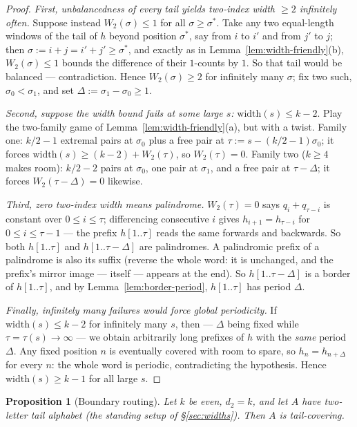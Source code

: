 \documentclass[11pt,reqno]{amsart}
\theoremstyle{plain}
\newtheorem{proposition}[theorem]{Proposition}
\theoremstyle{definition}
\theoremstyle{remark}
\begin{document}
\begin{proof}
\emph{First, unbalancedness of every tail yields two-index width $\ge 2$
infinitely often.} Suppose instead $W_2(\sigma) \le 1$ for all $\sigma \ge
\sigma^*$. Take any two equal-length windows of the tail of $h$ beyond position
$\sigma^*$, say from $i$ to $i'$ and from $j'$ to $j$; then $\sigma := i + j =
i' + j' \ge \sigma^*$, and exactly as in
Lemma~\ref{lem:width-friendly}(b), $W_2(\sigma) \le 1$ bounds the difference of
their $1$-counts by $1$. So that tail would be balanced --- contradiction. Hence
$W_2(\sigma) \ge 2$ for infinitely many $\sigma$; fix two such, $\sigma_0 <
\sigma_1$, and set $\Delta := \sigma_1 - \sigma_0 \ge 1$.

\emph{Second, suppose the width bound fails at some large $s$:} $\mathrm{width}(s)
\le k - 2$. Play the two-family game of Lemma~\ref{lem:width-friendly}(a), but with
a twist. Family one: $k/2 - 1$ extremal pairs at $\sigma_0$ plus a free pair at
$\tau := s - (k/2 - 1)\sigma_0$; it forces $\mathrm{width}(s) \ge (k - 2) +
W_2(\tau)$, so $W_2(\tau) = 0$. Family two ($k \ge 4$ makes room): $k/2 - 2$ pairs
at $\sigma_0$, one pair at $\sigma_1$, and a free pair at $\tau - \Delta$; it
forces $W_2(\tau - \Delta) = 0$ likewise.

\emph{Third, zero two-index width means palindrome.} $W_2(\tau) = 0$ says $q_i +
q_{\tau - i}$ is constant over $0 \le i \le \tau$; differencing consecutive $i$
gives $h_{i+1} = h_{\tau - i}$ for $0 \le i \le \tau - 1$ --- the prefix
$h[1..\tau]$ reads the same forwards and backwards. So both $h[1..\tau]$ and
$h[1..\tau - \Delta]$ are palindromes. A palindromic prefix of a palindrome is also
its suffix (reverse the whole word: it is unchanged, and the prefix's mirror image
--- itself --- appears at the end). So $h[1..\tau - \Delta]$ is a border of
$h[1..\tau]$, and by Lemma~\ref{lem:border-period}, $h[1..\tau]$ has period
$\Delta$.

\emph{Finally, infinitely many failures would force global periodicity.} If
$\mathrm{width}(s) \le k-2$ for infinitely many $s$, then --- $\Delta$ being fixed
while $\tau = \tau(s) \to \infty$ --- we obtain arbitrarily long prefixes of $h$
with the \emph{same} period $\Delta$. Any fixed position $n$ is eventually covered
with room to spare, so $h_n = h_{n + \Delta}$ for every $n$: the whole word is
periodic, contradicting the hypothesis. Hence $\mathrm{width}(s) \ge k - 1$ for all
large $s$.
\end{proof}

\begin{proposition}[Boundary routing]\label{prop:boundary-friendly}
Let $k$ be even, $d_2 = k$, and let $A$ have two-letter tail alphabet (the standing
setup of \S\ref{sec:widths}). Then $A$ is tail-covering.
\end{proposition}
\end{document}
